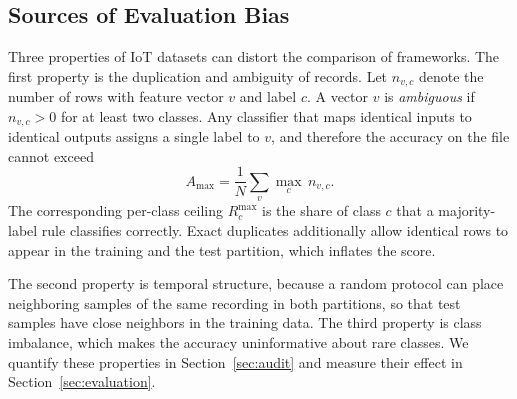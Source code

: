 \subsection{Sources of Evaluation Bias}
Three properties of IoT datasets can distort the comparison of frameworks. The first property is the duplication and ambiguity of records. Let $n_{v,c}$ denote the number of rows with feature vector $v$ and label $c$. A vector $v$ is \emph{ambiguous} if $n_{v,c}>0$ for at least two classes. Any classifier that maps identical inputs to identical outputs assigns a single label to $v$, and therefore the accuracy on the file cannot exceed
\begin{equation}
A_{\max}=\frac{1}{N}\sum_{v}\max_{c}\,n_{v,c}.
\label{eq:ceiling}
\end{equation}
The corresponding per-class ceiling $R^{\max}_c$ is the share of class $c$ that a majority-label rule classifies correctly. Exact duplicates additionally allow identical rows to appear in the training and the test partition, which inflates the score.

The second property is temporal structure, because a random protocol can place neighboring samples of the same recording in both partitions, so that test samples have close neighbors in the training data. The third property is class imbalance, which makes the accuracy uninformative about rare classes. We quantify these properties in Section~\ref{sec:audit} and measure their effect in Section~\ref{sec:evaluation}.
